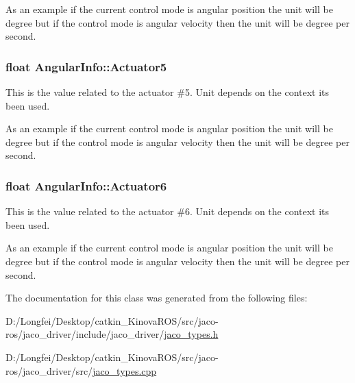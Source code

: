 As an example if the current control mode is angular position the unit will be degree but if the control mode is angular velocity then the unit will be degree per second. 
\subsubsection[{\texorpdfstring{Actuator5}{Actuator5}}]{\setlength{\rightskip}{0pt plus 5cm}float Angular\+Info\+::\+Actuator5\hspace{0.3cm}{\ttfamily [inherited]}}\hypertarget{structAngularInfo_a953c29d2481eb1c42c84e9c992d34dde}{}\label{structAngularInfo_a953c29d2481eb1c42c84e9c992d34dde}


This is the value related to the actuator \#5. Unit depends on the context it\textquotesingle{}s been used. 

As an example if the current control mode is angular position the unit will be degree but if the control mode is angular velocity then the unit will be degree per second. 
\subsubsection[{\texorpdfstring{Actuator6}{Actuator6}}]{\setlength{\rightskip}{0pt plus 5cm}float Angular\+Info\+::\+Actuator6\hspace{0.3cm}{\ttfamily [inherited]}}\hypertarget{structAngularInfo_ab54771129d8a9e451c27942dd349340d}{}\label{structAngularInfo_ab54771129d8a9e451c27942dd349340d}


This is the value related to the actuator \#6. Unit depends on the context it\textquotesingle{}s been used. 

As an example if the current control mode is angular position the unit will be degree but if the control mode is angular velocity then the unit will be degree per second. 

The documentation for this class was generated from the following files\+:\begin{DoxyCompactItemize}
\item 
D\+:/\+Longfei/\+Desktop/catkin\+\_\+\+Kinova\+R\+O\+S/src/jaco-\/ros/jaco\+\_\+driver/include/jaco\+\_\+driver/\hyperlink{jaco__types_8h}{jaco\+\_\+types.\+h}\item 
D\+:/\+Longfei/\+Desktop/catkin\+\_\+\+Kinova\+R\+O\+S/src/jaco-\/ros/jaco\+\_\+driver/src/\hyperlink{jaco__types_8cpp}{jaco\+\_\+types.\+cpp}\end{DoxyCompactItemize}
